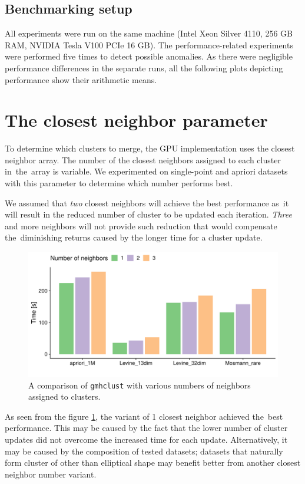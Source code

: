 \subsection{Benchmarking setup}

All experiments were run on the same machine (Intel Xeon Silver 4110, 256 GB RAM, NVIDIA Tesla V100 PCIe 16 GB). The performance-related experiments were performed five times to detect possible anomalies. As there were negligible performance differences in the separate runs, all the following plots depicting performance show their arithmetic means. 

\section{The closest neighbor parameter}

To determine which clusters to merge, the GPU implementation uses the closest neighbor array. The number of the closest neighbors assigned to each cluster in~the~array is variable. We experimented on single-point and apriori datasets with this parameter to determine which number performs best. 

We assumed that \emph{two} closest neighbors will achieve the best performance as~it will result in the reduced number of cluster to be updated each iteration. \emph{Three} and more neighbors will not provide such reduction that would compensate the~diminishing returns caused by the longer time for a cluster update.

\begin{figure}\centering
	\includegraphics[width=\linewidth]{img/neighbor_compare}
	\caption{A comparison of \texttt{gmhclust} with various numbers of neighbors assigned to clusters.}
	\label{fig04:neigh}
\end{figure}

As seen from the figure \ref{fig04:neigh}, the variant of 1 closest neighbor achieved the~best performance. This may be caused by the fact that the lower number of cluster updates did not overcome the increased time for each update. Alternatively, it may be caused by the composition of tested datasets; datasets that naturally form cluster of other than elliptical shape may benefit better from another closest neighbor number variant.

